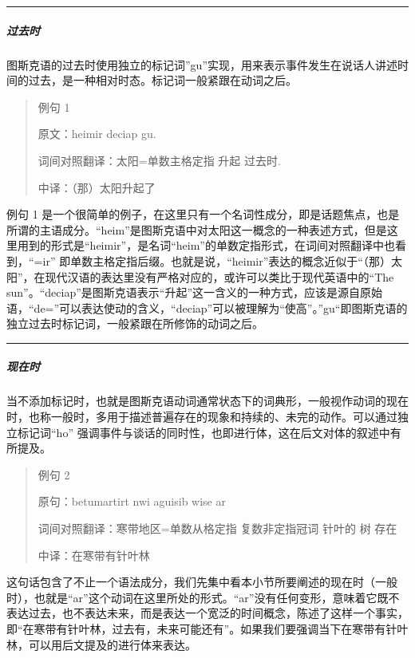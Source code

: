 \documentclass{article}
\begin{document}
\begin{center}\rule{0.5\linewidth}{0.5pt}\end{center}

\subparagraph{过去时}\label{ux8fc7ux53bbux65f6}

图斯克语的过去时使用独立的标记词''gu''实现，用来表示事件发生在说话人讲述时间的过去，是一种相对时态。标记词一般紧跟在动词之后。

\begin{quote}
例句 1

原文：heimir deciap gu.

词间对照翻译：太阳=单数主格定指 升起 过去时.

中译：（那）太阳升起了
\end{quote}

例句 1
是一个很简单的例子，在这里只有一个名词性成分，即是话题焦点，也是所谓的主语成分。``heim''是图斯克语中对太阳这一概念的一种表述方式，但是这里用到的形式是``heimir''，是名词``heim''的单数定指形式，在词间对照翻译中也看到，``=ir''
即单数主格定指后缀。也就是说，``heimir''表达的概念近似于``（那）太阳''，在现代汉语的表达里没有严格对应的，或许可以类比于现代英语中的``The
sun''。``deciap''是图斯克语表示``升起''这一含义的一种方式，应该是源自原始语，``de=''可以表达使动的含义，``deciap''可以被理解为``使高''。''gu``即图斯克语的独立过去时标记词，一般紧跟在所修饰的动词之后。

\begin{center}\rule{0.5\linewidth}{0.5pt}\end{center}

\subparagraph{现在时}\label{ux73b0ux5728ux65f6}

当不添加标记时，也就是图斯克语动词通常状态下的词典形，一般视作动词的现在时，也称一般时，多用于描述普遍存在的现象和持续的、未完的动作。可以通过独立标记词``ho''
强调事件与谈话的同时性，也即进行体，这在后文对体的叙述中有所提及。

\begin{quote}
例句 2

原句：betumartirt nwi aguisib wise ar

词间对照翻译：寒带地区=单数从格定指 复数非定指冠词 针叶的 树 存在

中译：在寒带有针叶林
\end{quote}

这句话包含了不止一个语法成分，我们先集中看本小节所要阐述的现在时（一般时），也就是``ar''这个动词在这里所处的形式。``ar''没有任何变形，意味着它既不表达过去，也不表达未来，而是表达一个宽泛的时间概念，陈述了这样一个事实，即``在寒带有针叶林，过去有，未来可能还有''。如果我们要强调当下在寒带有针叶林，可以用后文提及的进行体来表达。
\end{document}
